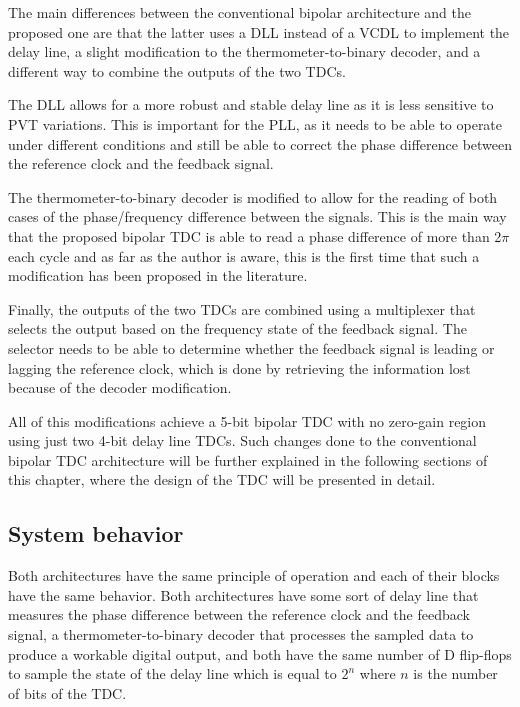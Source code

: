 The main differences between the conventional bipolar architecture and the proposed one are that the latter uses a DLL instead of a VCDL to implement the delay line, a slight modification
to the thermometer-to-binary decoder, and a different way to combine the outputs of the two TDCs.

The DLL allows for a more robust and stable delay line as it is less sensitive to PVT variations. This is important for the PLL, as it needs to be able to operate under different
conditions and still be able to correct the phase difference between the reference clock and the feedback signal.

The thermometer-to-binary decoder is modified to allow for the reading of both cases of the phase/frequency difference between the signals. This is the main way that the proposed bipolar TDC is able
to read a phase difference of more than 2$\pi$ each cycle and as far as the author is aware, this is the first time that such a modification has been proposed in the literature.

Finally, the outputs of the two TDCs are combined using a multiplexer that selects the output based on the frequency state of the feedback signal. The selector needs to be able to
determine whether the feedback signal is leading or lagging the reference clock, which is done by retrieving the information lost because of the decoder modification.


All of this modifications achieve a 5-bit bipolar TDC with no zero-gain region using just two 4-bit delay line TDCs. Such changes done to the conventional bipolar TDC architecture will be further 
explained in the following sections of this chapter, where the design of the TDC will be presented in detail.

\subsection{System behavior}
Both architectures have the same principle of operation and each of their blocks have the same behavior. Both architectures have some sort of delay line that measures the phase difference
between the reference clock and the feedback signal, a thermometer-to-binary decoder that processes the sampled data to produce a workable digital output, and both have the same number of 
D flip-flops to sample the state of the delay line which is equal to $2^n$ where $n$ is the number of bits of the TDC.

